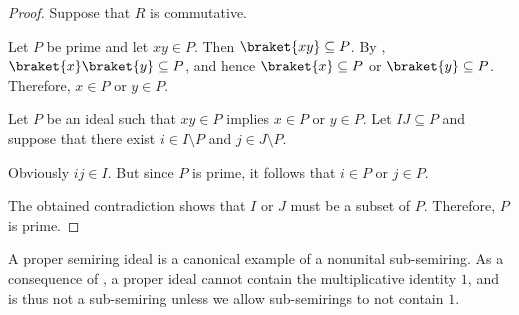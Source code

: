 \begin{proof}
   Suppose that \( R \) is commutative.

  \SufficiencySubProof* Let \( P \) be prime and let \( xy \in P \). Then \( \braket{xy} \subseteq P \). By , \( \braket{x} \braket{y} \subseteq P \), and hence \( \braket{x} \subseteq P \) or \( \braket{y} \subseteq P \). Therefore, \( x \in P \) or \( y \in P \).

  \NecessitySubProof* Let \( P \) be an ideal such that \( xy \in P \) implies \( x \in P \) or \( y \in P \). Let \( IJ \subseteq P \) and suppose that there exist \( i \in I \setminus P \) and \( j \in J \setminus P \).

  Obviously \( ij \in I \). But since \( P \) is prime, it follows that \( i \in P \) or \( j \in P \).

  The obtained contradiction shows that \( I \) or \( J \) must be a subset of \( P \). Therefore, \( P \) is prime.
\end{proof}

\begin{remark}\label{rem:semiring_ideal_as_sub_semiring}
  A proper semiring ideal is a canonical example of a nonunital sub-semiring. As a consequence of , a proper ideal cannot contain the multiplicative identity \( 1 \), and is thus not a sub-semiring unless we allow sub-semirings to not contain \( 1 \).
\end{remark}

